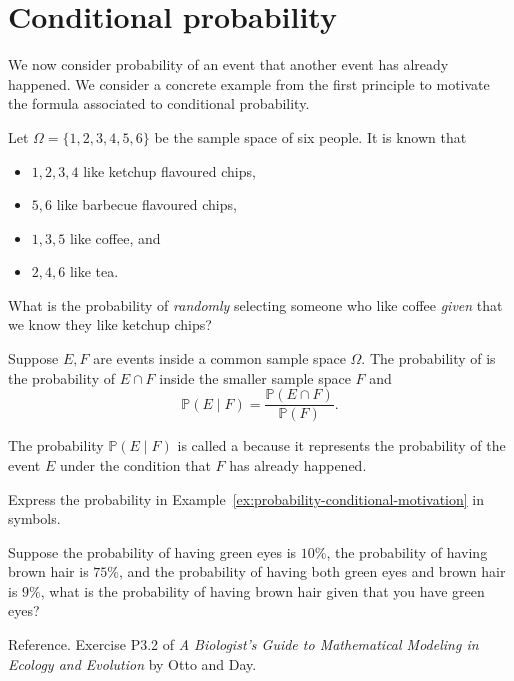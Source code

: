 \documentclass[../main.tex]{subfiles}
\begin{document}
 \section{Conditional probability}

We now consider probability of an event  that another event has already happened.   We consider a concrete example from the first principle to motivate the formula associated to conditional probability.

\begin{example} \label{ex:probability-conditional-motivation}
  Let \(\Omega = \{1,2,3,4,5,6\}\) be the sample space of six people.  It is known that 
  \begin{itemize}
    \item \(1,2,3,4\) like ketchup flavoured chips,
    \item \(5,6\) like barbecue flavoured chips,
    \item \(1,3,5\) like coffee, and
    \item \(2,4,6\) like tea.
  \end{itemize}

  What is the probability of \emph{randomly} selecting someone who like coffee \emph{given} that we know they like ketchup chips?

\end{example}

\begin{definition}
  Suppose \(E,F\) are events inside a common sample space \(\Omega\).  The probability of  is the probability of \(E \cap F\) inside the smaller sample space \(F\) and
  \[
    \mathbb{P}( E \mid F ) = \frac{\mathbb{P}(E \cap F)}{\mathbb{P}(F)}.
  \]

  The probability \(\mathbb{P}( E \mid F )\) is called a  because it represents the probability of the event \(E\) under the condition that \(F\) has already happened.
\end{definition}

\begin{example}
  Express the probability in Example~\ref{ex:probability-conditional-motivation} in symbols.
\end{example}
\clearpage


\begin{example}
  Suppose the probability of having green eyes is \(10\%\), the probability of having brown hair is \(75\%\), and the probability of having both green eyes and brown hair is \(9\%\), what is the probability of having brown hair given that you have green eyes?
  
  {\footnotesize Reference. Exercise P3.2 of \emph{A Biologist's Guide to Mathematical Modeling in Ecology and Evolution} by Otto and Day.}

\end{example}
\end{document}
